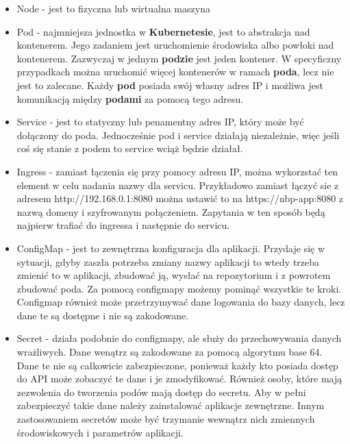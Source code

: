 \documentclass{iiuwb}
\begin{document}
\begin{itemize}
  \item Node - jest to fizyczna lub wirtualna maszyna

  \item Pod - najmniejsza jednostka w \textbf{Kubernetesie},
  jest to abstrakcja nad kontenerem. Jego zadaniem jest
  uruchomienie środowiska albo powłoki nad kontenerem. 
  Zazwyczaj w jednym \textbf{podzie} jest jeden kontener.
  W specyficzny przypadkach można uruchomić więcej kontenerów
  w ramach \textbf{poda}, lecz nie jest to zalecane. Każdy 
  \textbf{pod} posiada swój własny adres IP i możliwa jest
  komunikacją między \textbf{podami} za pomocą tego adresu.
  
  \item Service - jest to statyczny lub penamentny adres IP,
  który może być dołączony do poda. Jednocześnie pod i service
  działają niezależnie, więc jeśli coś się stanie z podem to
  service wciąż będzie działał.
  
  \item Ingress - zamiast łączenia się przy pomocy adresu IP,
  można wykorzstać ten element w celu nadania nazwy dla servicu.
  Przykładowo zamiast łączyć sie z adresem http://192.168.0.1:8080
  można ustawić to na https://nbp-app:8080 z nazwą domeny 
  i szyfrowanym połączeniem. Zapytania w ten sposób będą 
  najpierw trafiać do ingressa i następnie do servicu. 

  \item ConfigMap - jest to zewnętrzna konfiguracja dla aplikacji.
   Przydaje się w sytuacji, gdyby zaszła potrzeba zmiany nazwy 
   aplikacji to wtedy trzeba zmienić to w aplikacji, zbudować 
   ją, wysłać na repozytorium i z powrotem zbudować poda. 
   Za pomocą configmapy możemy pominąć wszystkie te kroki. 
   Configmap również może przetrzymywać dane logowania do bazy 
   danych, lecz dane te są dostępne i nie są zakodowane.

  \item Secret - działa podobnie do configmapy, ale służy do 
  przechowywania danych wrażliwych. Dane wenątrz są zakodowane 
  za pomocą algorytmu base 64. Dane te nie są całkowicie 
  zabezpieczone, ponieważ każdy kto posiada dostęp do API może
  zobaczyć te dane i je zmodyfikować. Również osoby, które mają
  zezwolenia do tworzenia podów mają dostęp do secretu. 
  Aby w pełni zabezpieczyć takie dane należy zainstalować aplikacje
  zewnętrzne. Innym zastosowaniem secretów może być trzymanie 
  wewnątrz nich zmiennych środowiskowych i parametrów aplikacji.


\end{itemize}
\end{document}
